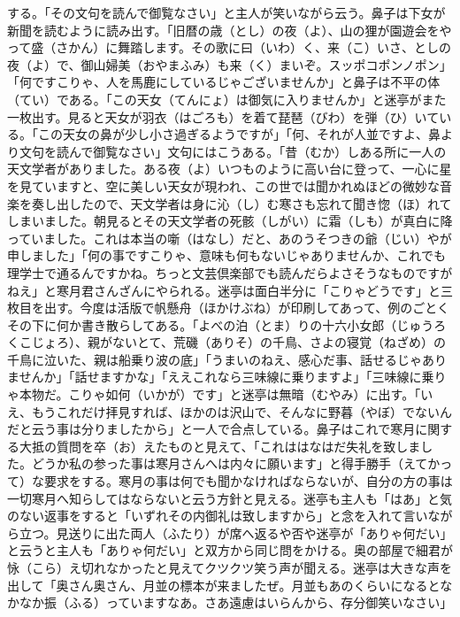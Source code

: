 \documentclass{book}
\begin{document}
する。「その文句を読んで御覧なさい」と主人が笑いながら云う。鼻子は下女が新聞を読むように読み出す。「旧暦の歳（とし）の夜（よ）、山の狸が園遊会をやって盛（さかん）に舞踏します。その歌に曰（いわ）く、来（こ）いさ、としの夜（よ）で、御山婦美（おやまふみ）も来（く）まいぞ。スッポコポンノポン」「何ですこりゃ、人を馬鹿にしているじゃございませんか」と鼻子は不平の体（てい）である。「この天女（てんにょ）は御気に入りませんか」と迷亭がまた一枚出す。見ると天女が羽衣（はごろも）を着て琵琶（びわ）を弾（ひ）いている。「この天女の鼻が少し小さ過ぎるようですが」「何、それが人並ですよ、鼻より文句を読んで御覧なさい」文句にはこうある。「昔（むか）しある所に一人の天文学者がありました。ある夜（よ）いつものように高い台に登って、一心に星を見ていますと、空に美しい天女が現われ、この世では聞かれぬほどの微妙な音楽を奏し出したので、天文学者は身に沁（し）む寒さも忘れて聞き惚（ほ）れてしまいました。朝見るとその天文学者の死骸（しがい）に霜（しも）が真白に降っていました。これは本当の噺（はなし）だと、あのうそつきの爺（じい）やが申しました」「何の事ですこりゃ、意味も何もないじゃありませんか、これでも理学士で通るんですかね。ちっと文芸倶楽部でも読んだらよさそうなものですがねえ」と寒月君さんざんにやられる。迷亭は面白半分に「こりゃどうです」と三枚目を出す。今度は活版で帆懸舟（ほかけぶね）が印刷してあって、例のごとくその下に何か書き散らしてある。「よべの泊（とま）りの十六小女郎（じゅうろくこじょろ）、親がないとて、荒磯（ありそ）の千鳥、さよの寝覚（ねざめ）の千鳥に泣いた、親は船乗り波の底」「うまいのねえ、感心だ事、話せるじゃありませんか」「話せますかな」「ええこれなら三味線に乗りますよ」「三味線に乗りゃ本物だ。こりゃ如何（いかが）です」と迷亭は無暗（むやみ）に出す。「いえ、もうこれだけ拝見すれば、ほかのは沢山で、そんなに野暮（やぼ）でないんだと云う事は分りましたから」と一人で合点している。鼻子はこれで寒月に関する大抵の質問を卒（お）えたものと見えて、「これははなはだ失礼を致しました。どうか私の参った事は寒月さんへは内々に願います」と得手勝手（えてかって）な要求をする。寒月の事は何でも聞かなければならないが、自分の方の事は一切寒月へ知らしてはならないと云う方針と見える。迷亭も主人も「はあ」と気のない返事をすると「いずれその内御礼は致しますから」と念を入れて言いながら立つ。見送りに出た両人（ふたり）が席へ返るや否や迷亭が「ありゃ何だい」と云うと主人も「ありゃ何だい」と双方から同じ問をかける。奥の部屋で細君が怺（こら）え切れなかったと見えてクツクツ笑う声が聞える。迷亭は大きな声を出して「奥さん奥さん、月並の標本が来ましたぜ。月並もあのくらいになるとなかなか振（ふる）っていますなあ。さあ遠慮はいらんから、存分御笑いなさい」\\
\end{document}
